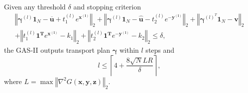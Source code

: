 \documentclass[review,hidelinks,onefignum,onetabnum]{siamart220329}
\begin{document}
\begin{theorem}\label{thm:num}
Given any threshold $\delta$ and stopping criterion
    \begin{multline*}
      \left\Vert \bm{\gamma}^{(l)}\bm{1}_N-\bm{\overline{u}}+t_1^{(l)} e^{\bm{x^{(l)}}} \right\Vert_2+ \left\Vert \bm{\gamma}^{(l)}\bm{1}_N-\bm{\hat{u}}-t_2^{(l)} e^{\bm{-y^{(l)}}}\right\Vert_2 + \left\Vert \bm{\gamma}^{(l)^T}\bm{1}_N-\bm{v} \right\Vert_2 \\
      + \left\Vert t_1^{(l)} \bm{1^T}e^{\bm{x^{(l)}}}-k_1 \right\Vert_2 + \left\Vert t_2^{(l)} \bm{1^T}e^{-\bm{y^{(l)}}}-k_2 \right\Vert_2 \leq \delta,
  \end{multline*}
the GAS-II outputs transport plan $\bm{\gamma}$
  within $l$ steps and  
  $$l\leq \left\lceil 4+\frac{8\sqrt{N} LR}{\delta} \right\rceil,$$
  where $L=\max \left\Vert \nabla^2 G(\bm{x},\bm{y},\bm{z}) \right\Vert_2 $.
\end{theorem}
\end{document}
